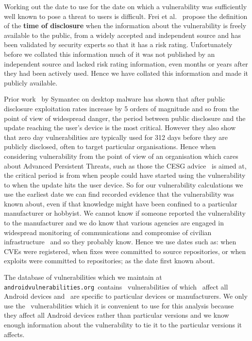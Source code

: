 \documentclass[conference,a4paper,twoside]{IEEEtran}
\newcommand{\avo}{\texttt{androidvulnerabilities.org}}
\begin{document}
Working out the date to use for the date on which a vulnerability was sufficiently well known to pose a threat to users is difficult.
Frei et al.~\cite{Frei2010} propose the definition of the {\bf time of disclosure} when the information about the vulnerability is freely available to the public, from a widely accepted and independent source and has been validated by security experts so that it has a risk rating.
Unfortunately before we collated this information much of it was not published by an independent source and lacked risk rating information, even months or years after they had been actively used.
Hence we have collated this information and made it publicly available.

Prior work~\cite{Bilge2012} by Symantec on desktop malware has shown that after public disclosure exploitation rates increase by 5 orders of magnitude and so from the point of view of widespread danger, the period between public disclosure and the update reaching the user's device is the most critical.
However they also show that zero day vulnerabilities are typically used for 312 days before they are publicly disclosed, often to target particular organisations.
Hence when considering vulnerability from the point of view of an organisation which cares about Advanced Persistent Threats, such as those the CESG advice~\cite{CESG2013} is aimed at, the critical period is from when people could have started using the vulnerability to when the update hits the user device.
So for our vulnerability calculations we use the earliest date we can find recorded evidence that the vulnerability was known about, even if that knowledge might have been confined to a particular manufacturer or hobbyist.
We cannot know if someone reported the vulnerability to the manufacturer and we do know that various agencies are engaged in widespread monitoring of communications and compromise of civilian infrastructure~\cite{TODO} and so they probably know.
Hence we use dates such as: when CVEs were registered, when fixes were committed to source repositories, or when exploits were committed to repositories; as the date first known about.

\avoTabAndVulns

The database of vulnerabilities which we maintain at \avo\ contains \avoNumVulnerabilities\ vulnerabilities of which \avoNumVulnAllAndroid\ affect all Android devices and \avoNumVulnSpecific\ are specific to particular devices or manufacturers.
We only use the \daNumVulnsUsed\ vulnerabilities which it is convenient to use for this analysis because they affect all Android devices rather than particular versions and we know enough information about the vulnerability to tie it to the particular versions it affects.
\end{document}
